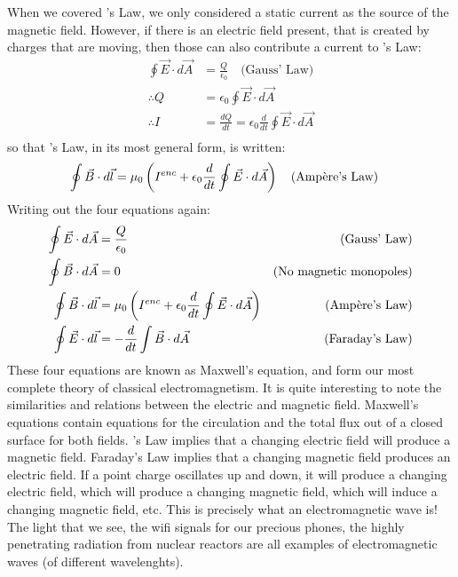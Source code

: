 When we covered \ampere's Law, we only considered a static current as the source of the magnetic field. However, if there is an electric field present, that is created by charges that are moving, then those can also contribute a current to \ampere's Law:
\begin{align*}
\oint \vec E\cdot d\vec A &= \frac{Q}{\epsilon_0}\quad \text{(Gauss' Law)}\\
\therefore Q &= \epsilon_0 \oint \vec E\cdot d\vec A\\
\therefore I &= \frac{dQ}{dt} = \epsilon_0\frac{d}{dt} \oint \vec E\cdot d\vec A\\
\end{align*}
so that \ampere's Law, in its most general form, is written:
\begin{align*}
\oint \vec B\cdot d\vec l &= \mu_0 \left(I^{enc}+\epsilon_0\frac{d}{dt} \oint \vec E\cdot d\vec A\right)\quad \text{(\ampere's Law)}
\end{align*}
Writing out the four equations again:
\begin{align*}
\oint \vec E\cdot d\vec A &= \frac{Q}{\epsilon_0} &\text{(Gauss' Law)}\\
\oint \vec B\cdot d\vec A &= 0 &\text{(No magnetic monopoles)}\\
\oint \vec B\cdot d\vec l &= \mu_0 \left(I^{enc}+\epsilon_0\frac{d}{dt} \oint \vec E\cdot d\vec A\right) &\text{(\ampere's Law)}\\
\oint \vec E\cdot d\vec l &= -\frac{d}{dt}\int \vec B\cdot d\vec A  &\text{(Faraday's Law)}\\
\end{align*}
These four equations are known as Maxwell's equation, and form our most complete theory of classical electromagnetism. It is quite interesting to note the similarities and relations between the electric and magnetic field. Maxwell's equations contain equations for the circulation and the total flux out of a closed surface for both fields. \ampere's Law implies that a changing electric field will produce a magnetic field. Faraday's Law implies that a changing magnetic field produces an electric field. If a point charge oscillates up and down, it will produce a changing electric field, which will produce a changing magnetic field, which will induce a changing magnetic field, etc. This is precisely what an electromagnetic wave is! The light that we see, the wifi signals for our precious phones, the highly penetrating radiation from nuclear reactors are all examples of electromagnetic waves (of different wavelenghts). 

